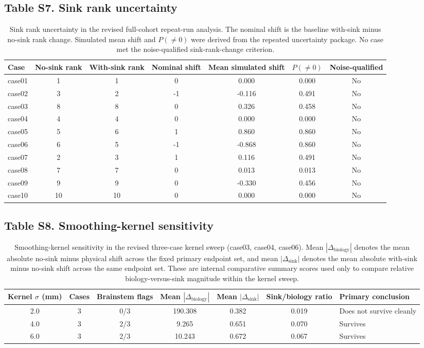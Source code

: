 \documentclass[10pt,a4paper]{article}
\begin{document}
\subsection{Table S7. Sink rank uncertainty}
\begin{table}[H]
\centering
\caption{Sink rank uncertainty in the revised full-cohort repeat-run analysis. The nominal shift is the baseline with-sink minus no-sink rank change. Simulated mean shift and $P(\neq0)$ were derived from the repeated uncertainty package. No case met the noise-qualified sink-rank-change criterion.}
\label{tab:s7_sink_rank_uncertainty}
\footnotesize
\begin{tabular}{lcccccc}
\toprule
Case & No-sink rank & With-sink rank & Nominal shift & Mean simulated shift & $P(\neq 0)$ & Noise-qualified \\
\midrule
case01 & 1 & 1 & 0 & 0.000 & 0.000 & No \\
case02 & 3 & 2 & -1 & -0.116 & 0.491 & No \\
case03 & 8 & 8 & 0 & 0.326 & 0.458 & No \\
case04 & 4 & 4 & 0 & 0.000 & 0.000 & No \\
case05 & 5 & 6 & 1 & 0.860 & 0.860 & No \\
case06 & 6 & 5 & -1 & -0.868 & 0.860 & No \\
case07 & 2 & 3 & 1 & 0.116 & 0.491 & No \\
case08 & 7 & 7 & 0 & 0.013 & 0.013 & No \\
case09 & 9 & 9 & 0 & -0.330 & 0.456 & No \\
case10 & 10 & 10 & 0 & 0.000 & 0.000 & No \\
\bottomrule
\end{tabular}
\end{table}
\subsection{Table S8. Smoothing-kernel sensitivity}
\begin{table}[H]
\centering
\caption{Smoothing-kernel sensitivity in the revised three-case kernel sweep (case03, case04, case06). Mean $|\Delta_{\mathrm{biology}}|$ denotes the mean absolute no-sink minus physical shift across the fixed primary endpoint set, and mean $|\Delta_{\mathrm{sink}}|$ denotes the mean absolute with-sink minus no-sink shift across the same endpoint set. These are internal comparative summary scores used only to compare relative biology-versus-sink magnitude within the kernel sweep.}
\label{tab:s8_smoothing_kernel_sensitivity}
\footnotesize
\setlength{\tabcolsep}{4pt}
\begin{tabularx}{\linewidth}{c c c c c c X}
\toprule
Kernel $\sigma$ (mm) & Cases & Brainstem flags & Mean $|\Delta_{\mathrm{biology}}|$ & Mean $|\Delta_{\mathrm{sink}}|$ & Sink/biology ratio & Primary conclusion \\
\midrule
2.0 & 3 & 0/3 & 190.308 & 0.382 & 0.019 & Does not survive cleanly \\
4.0 & 3 & 2/3 & 9.265 & 0.651 & 0.070 & Survives \\
6.0 & 3 & 2/3 & 10.243 & 0.672 & 0.067 & Survives \\
\bottomrule
\end{tabularx}
\end{table}
\end{document}
